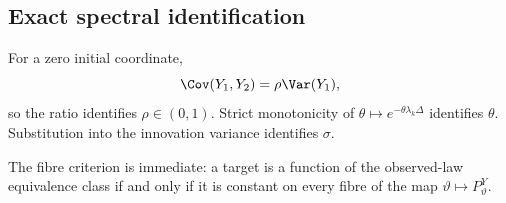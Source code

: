 \subsection{Exact spectral identification}
For a zero initial coordinate,
\[
 \Cov(Y_1,Y_2)=\rho\Var(Y_1),
\]
so the ratio identifies $\rho\in(0,1)$. Strict monotonicity of $\theta\mapsto e^{-\theta\lambda_k\Delta}$ identifies $\theta$. Substitution into the innovation variance identifies $\sigma$.

The fibre criterion is immediate: a target is a function of the observed-law equivalence class if and only if it is constant on every fibre of the map $\vartheta\mapsto P_\vartheta^Y$.
